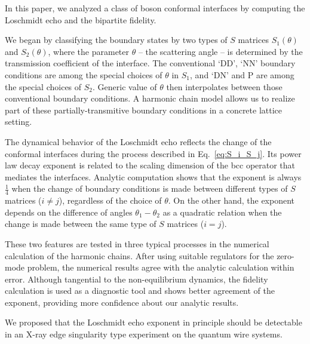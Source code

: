 
In this paper, we analyzed a class of boson conformal interfaces by computing the Loschmidt echo and the bipartite fidelity. 

We began by classifying the boundary states by two types of $S$ matrices $S_1(\theta)$ and $S_2(\theta)$, where the parameter $\theta$ -- the scattering angle -- is determined by the transmission coefficient of the interface. The conventional `DD', `NN' boundary conditions are among the special choices of $\theta$ in $S_1$, and `DN' and P are among the special choices of $S_2$. Generic value of $\theta$ then interpolates between those conventional boundary conditions. A harmonic chain model allows us to realize part of these partially-transmitive boundary conditions in a concrete lattice setting. 

The dynamical behavior of the Loschmidt echo reflects the change of the conformal interfaces during the process described in Eq.~\eqref{eq:S_i_S_j}.
Its power law decay exponent is related to the scaling dimension of the bcc operator that mediates the interfaces. Analytic computation shows that the exponent is always $\frac{1}{4}$ when the change of boundary conditions is made between different types of $S$ matrices ($i \ne j$), regardless of the choice of $\theta$. On the other hand, the exponent depends on the difference of angles $\theta_1 - \theta_2$ as a quadratic relation when the change is made between the same type of $S$ matrices ($i = j$).

These two features are tested in three typical processes in the numerical calculation of the harmonic chains. After using suitable regulators for the zero-mode problem, the numerical results agree with the analytic calculation within error. Although tangential to the non-equilibrium dynamics, the fidelity calculation is used as a diagnostic tool and shows better agreement of the exponent, providing more confidence about our analytic results. 

We proposed that the Loschmidt echo exponent in principle should be detectable in an X-ray edge singularity type experiment on the quantum wire systems. 

